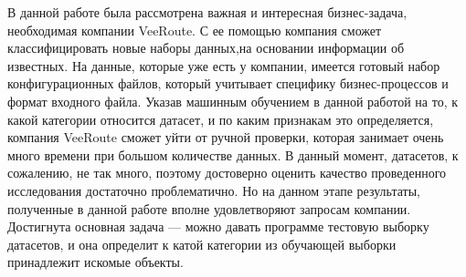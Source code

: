\startconclusionpage

В данной работе была рассмотрена важная и интересная бизнес-задача, необходимая компании VeeRoute.
С ее помощью компания сможет классифицировать новые наборы данных,на основании информации об известных.
На данные, которые уже есть у компании, имеется готовый набор конфигурационных файлов, который учитывает специфику бизнес-процессов и формат входного файла.
Указав машинным обучением в данной работой на то, к какой категории относится датасет, и по каким признакам это определяется, компания VeeRoute сможет уйти от ручной проверки, которая занимает очень много времени при большом количестве данных.
В данный момент, датасетов, к сожалению, не так много, поэтому достоверно оценить качество проведенного исследования достаточно проблематично. Но на данном этапе результаты, полученные в данной работе вполне удовлетворяют запросам компании.
Достигнута основная задача --- можно давать программе тестовую выборку датасетов, и она определит к катой категории из обучающей выборки принадлежит искомые объекты.

